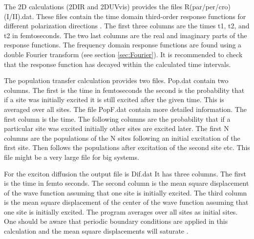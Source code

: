 
The 2D calculations (2DIR and 2DUVvis) provides the files R(par/per/cro)(I/II).dat. These files contain the time domain
third-order response functions for different polarization directions \cite{Hochstrasser.2001.CP.266.273,Zanni.2001.PNAS.98.11265}.
The first three columns are the times t1, t2, and t2 in femtoseconds.
The two last columns are the real and imaginary parts of the response functions. The frequency domain
response functions are found using a double Fourier transform (see section \ref{sec:Fourier}).
It is recommended to check that the response function has decayed within the calculated time intervals.


The population transfer calculation provides two files. Pop.dat contain two columns. The first is the
time in femtoseconds the second is the probability that if a site was initially excited it is still excited
after the given time. This is averaged over all sites. The file PopF.dat contain more detailed information.
The first column is the time. The following columns are the probability that if a particular site was excited
initially other sites are excited later. The first N columns are the populations of the N sites following an initial excitation of the first site. Then follows the populations after excitation of the second site etc. This file might be a very large file for big systems.

For the exciton diffusion the output file is Dif.dat It has three columns. The first is the time in femto seconds. The second column is the mean square displacement of the wave function assuming that
one site is initially excited. The third column is the mean square displacement of the center of the 
wave function assuming that one site is initially excited. The program averages over all sites as
initial sites. One should be aware that periodic boundary conditions are applied in this calculation
and the mean square displacements will saturate \cite{Jansen.2010.JCP.132.224503}.

